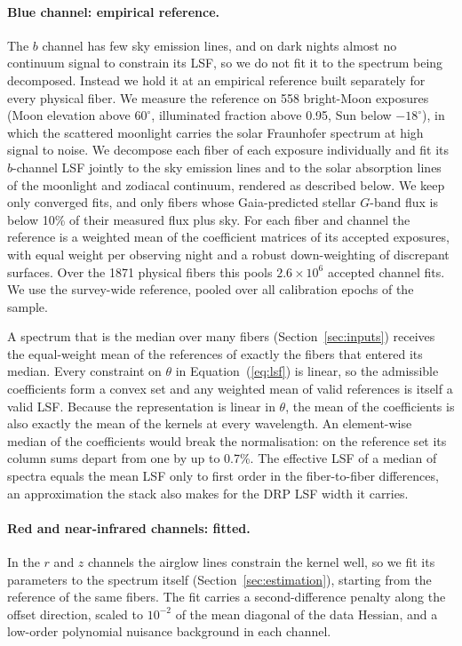 \paragraph{Blue channel: empirical reference.} The $b$ channel has few sky
emission lines, and on dark nights almost no continuum signal to constrain
its LSF, so we do not fit it to the spectrum being decomposed. Instead we
hold it at an empirical reference built separately for every physical fiber.
We measure the reference on 558 bright-Moon exposures (Moon elevation above
$60^\circ$, illuminated fraction above 0.95, Sun below $-18^\circ$), in
which the scattered moonlight carries the solar Fraunhofer spectrum at high
signal to noise. We decompose each fiber of each exposure individually and
fit its $b$-channel LSF jointly to the sky emission lines and to the solar
absorption lines of the moonlight and zodiacal continuum, rendered as
described below. We keep only converged fits, and only fibers whose
Gaia-predicted stellar $G$-band flux is below 10\% of their measured flux
plus sky. For each fiber and channel the reference is a weighted mean of the
coefficient matrices of its accepted exposures, with equal weight per
observing night and a robust down-weighting of discrepant surfaces. Over the
1871 physical fibers this pools $2.6\times10^6$ accepted channel fits. We
use the survey-wide reference, pooled over all calibration epochs of the
sample.

A spectrum that is the median over many fibers
(Section~\ref{sec:inputs}) receives the equal-weight mean of the references
of exactly the fibers that entered its median. Every constraint on $\theta$
in Equation~(\ref{eq:lsf}) is linear, so the admissible coefficients form a
convex set and any weighted mean of valid references is itself a valid LSF.
Because the representation is linear in $\theta$, the mean of the
coefficients is also exactly the mean of the kernels at every wavelength. An
element-wise median of the coefficients would break the normalisation: on
the reference set its column sums depart from one by up to 0.7\%. The
effective LSF of a median of spectra equals the mean LSF only to first order
in the fiber-to-fiber differences, an approximation the stack also makes
for the DRP LSF width it carries.

\paragraph{Red and near-infrared channels: fitted.} In the $r$ and $z$
channels the airglow lines constrain the kernel well, so we fit its
parameters to the spectrum itself (Section~\ref{sec:estimation}), starting
from the reference of the same fibers. The fit carries a second-difference
penalty along the offset direction, scaled to $10^{-2}$ of the mean diagonal
of the data Hessian, and a low-order polynomial nuisance background in each
channel.


